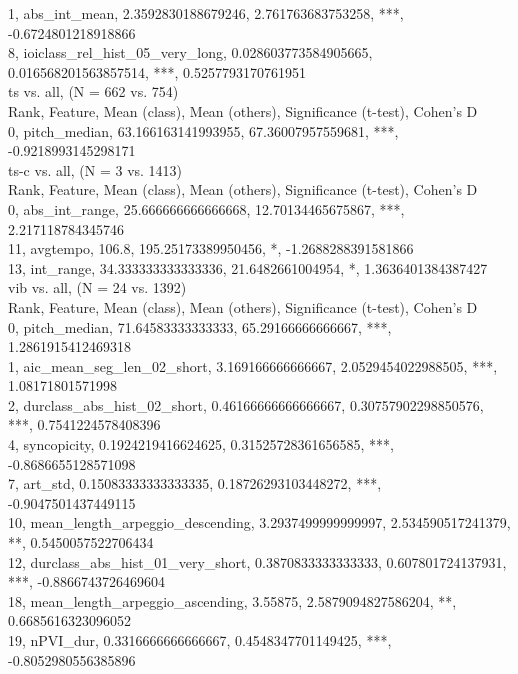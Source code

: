 1, abs_int_mean, 2.3592830188679246, 2.761763683753258, ***, -0.6724801218918866\\
8, ioiclass_rel_hist_05_very_long, 0.028603773584905665, 0.016568201563857514, ***, 0.5257793170761951\\
ts vs. all, (N = 662 vs. 754)\\
Rank, Feature, Mean (class), Mean (others), Significance (t-test), Cohen's D\\
0, pitch_median, 63.166163141993955, 67.36007957559681, ***, -0.9218993145298171\\
ts-c vs. all, (N = 3 vs. 1413)\\
Rank, Feature, Mean (class), Mean (others), Significance (t-test), Cohen's D\\
0, abs_int_range, 25.666666666666668, 12.70134465675867, ***, 2.217118784345746\\
11, avgtempo, 106.8, 195.25173389950456, *, -1.2688288391581866\\
13, int_range, 34.333333333333336, 21.6482661004954, *, 1.3636401384387427\\
vib vs. all, (N = 24 vs. 1392)\\
Rank, Feature, Mean (class), Mean (others), Significance (t-test), Cohen's D\\
0, pitch_median, 71.64583333333333, 65.29166666666667, ***, 1.2861915412469318\\
1, aic_mean_seg_len_02_short, 3.169166666666667, 2.0529454022988505, ***, 1.08171801571998\\
2, durclass_abs_hist_02_short, 0.46166666666666667, 0.30757902298850576, ***, 0.7541224578408396\\
4, syncopicity, 0.1924219416624625, 0.31525728361656585, ***, -0.8686655128571098\\
7, art_std, 0.15083333333333335, 0.18726293103448272, ***, -0.9047501437449115\\
10, mean_length_arpeggio_descending, 3.2937499999999997, 2.534590517241379, **, 0.5450057522706434\\
12, durclass_abs_hist_01_very_short, 0.3870833333333333, 0.607801724137931, ***, -0.8866743726469604\\
18, mean_length_arpeggio_ascending, 3.55875, 2.5879094827586204, **, 0.6685616323096052\\
19, nPVI_dur, 0.3316666666666667, 0.4548347701149425, ***, -0.8052980556385896\\
